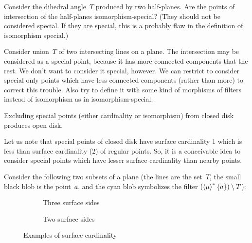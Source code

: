
Consider the dihedral angle~$T$ produced by two half-planes. Are the points of
intersection of the half-planes isomorphism-special? (They should not
be considered special. If they are special, this is a probably flaw in
the definition of isomorphism special.)

Consider union~$T$ of two intersecting lines on a plane. The intersection
may be considered as a special point, because it has more connected
components that the rest. We don't want to consider it special, however.
We can restrict to consider special only points which have less connected
components (rather than more) to correct this trouble. Also try to define
it with some kind of morphisms of filters instead of isomorphism as in
isomorphism-special.

\begin{xca}
Excluding special points (either cardinality or isomorphism) from closed disk
produces open disk.
\end{xca}

Let us note that special points of closed disk have surface cardinality
$1$ which is less than surface cardinality ($2$) of regular points.
So, it is a conceivable idea to consider special points which have
lesser surface cardinality than nearby points.

Consider the following two subsets of a plane (the lines are the
set~$T$, the small black blob is the point~$a$, and the cyan
blob symbolizes the filter $(\left\langle \mu\right\rangle ^{\ast}\{a\})\setminus T$):

\begin{figure}
  \begin{subfigure}[c]{0.3\textwidth}
    \centering
    \caption{Three surface sides}
  \end{subfigure}
  \begin{subfigure}[c]{0.3\textwidth}
    \centering
    \caption{Two surface sides}
  \end{subfigure}
  \caption{Examples of surface cardinality}
\end{figure}

